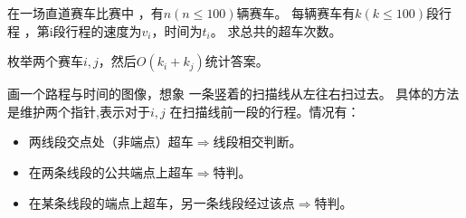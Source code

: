 \begin{prob}
	在一场直道赛车比赛中
	，有$n(n\le 100)$辆赛车。
	每辆赛车有$k(k\le 100)$段行程
	，第i段行程的速度为$v_i$，时间为$t_i$。
	求总共的超车次数。
\end{prob}

\begin{sol}
	枚举两个赛车$i,j$，然后$O(k_i+k_j)$统计答案。
	\par
	画一个路程与时间的图像，想象
	一条竖着的扫描线从左往右扫过去。
	具体的方法是维护两个指针,表示对于$i,j$
	在扫描线前一段的行程。情况有：
	\begin{itemize}
		\item 两线段交点处（非端点）超车$\Rightarrow$线段相交判断。
		\item 在两条线段的公共端点上超车$\Rightarrow$特判。
		\item 在某条线段的端点上超车，另一条线段经过该点$\Rightarrow$特判。
	\end{itemize}
\end{sol}
